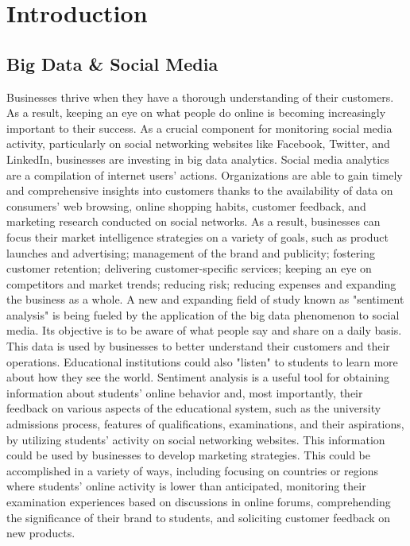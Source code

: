 \documentclass[openacc]{rsproca_new}%
\begin{document}
\maketitle


\section{Introduction}
\subsection{Big Data & Social Media}
Businesses thrive when they have a thorough understanding of their customers. As a result, keeping an eye on what people do online is becoming increasingly important to their success. As a crucial component for monitoring social media activity, particularly on social networking websites like Facebook, Twitter, and LinkedIn, businesses are investing in big data analytics.
Social media analytics are a compilation of internet users' actions. Organizations are able to gain timely and comprehensive insights into customers thanks to the availability of data on consumers' web browsing, online shopping habits, customer feedback, and marketing research conducted on social networks. As a result, businesses can focus their market intelligence strategies on a variety of goals, such as product launches and advertising; management of the brand and publicity;
fostering customer retention; delivering customer-specific services; keeping an eye on competitors and market trends;
reducing risk; reducing expenses and expanding the business as a whole.
A new and expanding field of study known as "sentiment analysis" is being fueled by the application of the big data phenomenon to social media. Its objective is to be aware of what people say and share on a daily basis. This data is used by businesses to better understand their customers and their operations. Educational institutions could also "listen" to students to learn more about how they see the world. Sentiment analysis is a useful tool for obtaining information about students' online behavior and, most importantly, their feedback on various aspects of the educational system, such as the university admissions process, features of qualifications, examinations, and their aspirations, by utilizing students' activity on social networking websites.
This information could be used by businesses to develop marketing strategies. This could be accomplished in a variety of ways, including focusing on countries or regions where students' online activity is lower than anticipated, monitoring their examination experiences based on discussions in online forums, comprehending the significance of their brand to students, and soliciting customer feedback on new products.
\end{document}
